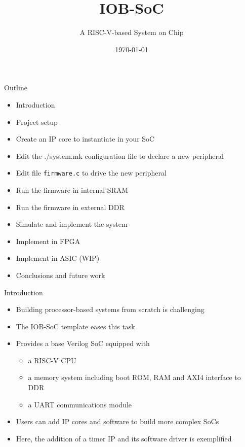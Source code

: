 \documentclass [xcolor=svgnames, t] {beamer}
\title[IOB-SoC Presentation]{IOB-SoC}
\subtitle{A RISC-V-based System on Chip}
\institute[IObundle Lda]{IObundle Lda.\\The Architecture for an Agile World}
\institute[IObundle Lda]{IObundle Lda}
\date{\today}
\begin{document}
\begin{frame}
 \titlepage   
\end{frame}


\begin{frame}{Outline}
\begin{center}
   \begin{itemize}
     \item Introduction
     \item Project setup
     \item Create an IP core to instantiate in your SoC
     \item Edit the ./system.mk configuration file to declare a new peripheral
     \item Edit file {\tt firmware.c} to drive the new peripheral
     \item Run the firmware in internal SRAM
     \item Run the firmware in external DDR
     \item Simulate and implement the system
     \item Implement in FPGA
     \item Implement in ASIC (WIP)
     \item Conclusions and future work
 \end{itemize}
\end{center}
\end{frame}


\begin{frame}{Introduction}
\begin{center}
    \begin{itemize}
      \item Building processor-based systems from scratch is challenging
      \item The IOB-SoC template eases this task
      \item Provides a base Verilog SoC equipped with
        \begin{itemize}
        \item a RISC-V CPU
        \item a memory system including boot ROM, RAM and AXI4 interface to DDR
        \item a UART communications module
        \end{itemize}
      \item Users can add IP cores and software to build more complex SoCs
      \item Here, the addition of a timer IP and its software driver is exemplified
    \end{itemize}
\end{center}
\end{frame}
\end{document}
